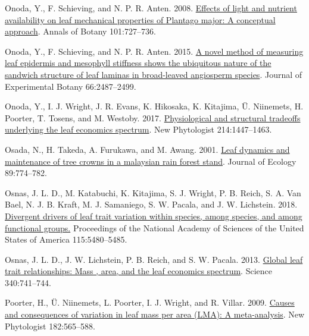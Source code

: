 \documentclass[
  12pt,
]{article}
\newlength{\cslhangindent} %
\newlength{\cslentryspacingunit} %
\newenvironment{CSLReferences}[2] %
 {%
  \setlength{\parindent}{0pt} %
  \ifodd #1 %
  \let\oldpar\par %
  \def\par{\hangindent=\cslhangindent\oldpar} %
  \fi %
  \setlength{\parskip}{#2\cslentryspacingunit} %
 }%
 {} %
\providecommand{\DIFdelbegin}{} %
\providecommand{\DIFdelend}{} %
\newcommand{\DIFscaledelfig}{0.5}
\newlength{\DIFdelgraphicswidth} %
\newlength{\DIFdelgraphicsheight} %
\newcommand{\DIFdelincludegraphics}[2][]{%
\sbox{\DIFdelgraphicsbox}{\DIFOincludegraphics[#1]{#2}}%
\settoboxwidth{\DIFdelgraphicswidth}{\DIFdelgraphicsbox} %
\settoboxtotalheight{\DIFdelgraphicsheight}{\DIFdelgraphicsbox} %
\scalebox{\DIFscaledelfig}{%
\parbox[b]{\DIFdelgraphicswidth}{\usebox{\DIFdelgraphicsbox}\\[-\baselineskip] \rule{\DIFdelgraphicswidth}{0em}}\llap{\resizebox{\DIFdelgraphicswidth}{\DIFdelgraphicsheight}{%
\setlength{\unitlength}{\DIFdelgraphicswidth}%
\begin{picture}(1,1)%
\thicklines\linethickness{2pt} %
{\color[rgb]{1,0,0}\put(0,0){\framebox(1,1){}}}%
{\color[rgb]{1,0,0}\put(0,0){\line( 1,1){1}}}%
{\color[rgb]{1,0,0}\put(0,1){\line(1,-1){1}}}%
\end{picture}%
}\hspace*{3pt}}} %
} %
\DeclareRobustCommand{\DIFdelbegin}{\DIFOdelbegin \let\includegraphics\DIFdelincludegraphics} %
\DeclareRobustCommand{\DIFdelend}{\DIFOaddend \let\includegraphics\DIFOincludegraphics} %
\begin{document}
\begin{CSLReferences}{1}{0}
\leavevmode{}%
Onoda, Y., F. Schieving, and N. P. R. Anten. 2008. \href{https://doi.org/10.1093/aob/mcn013}{Effects of light and nutrient availability on leaf mechanical properties of {Plantago} major: \DIFdelbegin %
\DIFdelend A \DIFdelbegin %
\DIFdelend conceptual approach}. Annals of Botany 101:727--736.

\leavevmode{}%
Onoda, Y., F. Schieving, and N. P. R. Anten. 2015. \href{https://doi.org/10.1093/jxb/erv024}{A novel method of measuring leaf epidermis and mesophyll stiffness shows the ubiquitous nature of the sandwich structure of leaf laminas in broad-leaved angiosperm species}. Journal of Experimental Botany 66:2487--2499.

\leavevmode{}%
Onoda, Y., I. J. Wright, J. R. Evans, K. Hikosaka, K. Kitajima, Ü. Niinemets, H. Poorter, T. Tosens, and M. Westoby. 2017. \href{https://doi.org/10.1111/nph.14496}{Physiological and structural tradeoffs underlying the leaf economics spectrum}. New Phytologist 214:1447--1463.

\leavevmode{}%
Osada, N., H. Takeda, A. Furukawa, and M. Awang. 2001. \href{https://doi.org/10.1046/j.0022-0477.2001.00590.x}{Leaf dynamics and maintenance of tree crowns in a malaysian rain forest stand}. Journal of Ecology 89:774--782.

\leavevmode{}%
Osnas, J. L. D., M. Katabuchi, K. Kitajima, S. J. Wright, P. B. Reich, S. A. Van Bael, N. J. B. Kraft, M. J. Samaniego, S. W. Pacala, and J. W. Lichstein. 2018. \href{https://doi.org/10.1073/pnas.1803989115}{Divergent drivers of leaf trait variation within species, among species, and among functional groups.} Proceedings of the National Academy of Sciences of the United States of America 115:5480--5485.

\leavevmode{}%
Osnas, J. L. D., J. W. Lichstein, P. B. Reich, and S. W. Pacala. 2013. \href{https://doi.org/10.1126/science.1231574}{Global leaf trait relationships: \DIFdelbegin %
\DIFdelend Mass\DIFdelbegin %
\DIFdelend , area, and the leaf economics spectrum}. Science 340:741--744.

\leavevmode{}%
Poorter, H., Ü. Niinemets, L. Poorter, I. J. Wright, and R. Villar. 2009. \href{https://doi.org/10.1111/j.1469-8137.2009.02830.x}{Causes and consequences of variation in leaf mass per area ({LMA}): \DIFdelbegin %
\DIFdelend A \DIFdelbegin %
\DIFdelend meta-analysis}. New Phytologist 182:565--588.


\end{CSLReferences}
\end{document}
